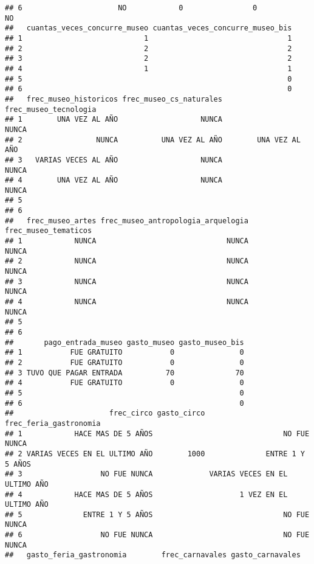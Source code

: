 \documentclass[
]{article}
\begin{document}
\begin{verbatim}
## 6                      NO            0                0             NO
##   cuantas_veces_concurre_museo cuantas_veces_concurre_museo_bis
## 1                            1                                1
## 2                            2                                2
## 3                            2                                2
## 4                            1                                1
## 5                                                             0
## 6                                                             0
##   frec_museo_historicos frec_museo_cs_naturales frec_museo_tecnologia
## 1        UNA VEZ AL AÑO                   NUNCA                 NUNCA
## 2                 NUNCA          UNA VEZ AL AÑO        UNA VEZ AL AÑO
## 3   VARIAS VECES AL AÑO                   NUNCA                 NUNCA
## 4        UNA VEZ AL AÑO                   NUNCA                 NUNCA
## 5                                                                    
## 6                                                                    
##   frec_museo_artes frec_museo_antropologia_arquelogia frec_museo_tematicos
## 1            NUNCA                              NUNCA                NUNCA
## 2            NUNCA                              NUNCA                NUNCA
## 3            NUNCA                              NUNCA                NUNCA
## 4            NUNCA                              NUNCA                NUNCA
## 5                                                                         
## 6                                                                         
##       pago_entrada_museo gasto_museo gasto_museo_bis
## 1           FUE GRATUITO           0               0
## 2           FUE GRATUITO           0               0
## 3 TUVO QUE PAGAR ENTRADA          70              70
## 4           FUE GRATUITO           0               0
## 5                                                  0
## 6                                                  0
##                      frec_circo gasto_circo        frec_feria_gastronomia
## 1            HACE MAS DE 5 AÑOS                              NO FUE NUNCA
## 2 VARIAS VECES EN EL ULTIMO AÑO        1000              ENTRE 1 Y 5 AÑOS
## 3                  NO FUE NUNCA             VARIAS VECES EN EL ULTIMO AÑO
## 4            HACE MAS DE 5 AÑOS                    1 VEZ EN EL ULTIMO AÑO
## 5              ENTRE 1 Y 5 AÑOS                              NO FUE NUNCA
## 6                  NO FUE NUNCA                              NO FUE NUNCA
##   gasto_feria_gastronomia        frec_carnavales gasto_carnavales

\end{verbatim}
\end{document}
